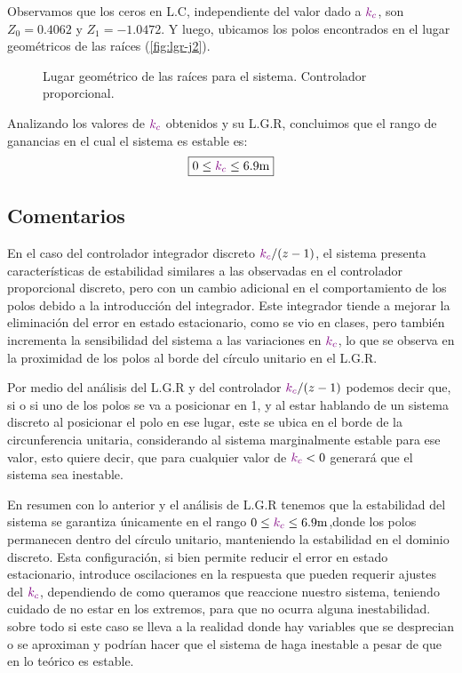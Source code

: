Observamos que los ceros en L.C, independiente del valor dado a \(\mathbin{\color{violet}k_c}\),
son $Z_{0} = 0.4062 $ y $Z_{1} = -1.0472$. Y luego, ubicamos los polos encontrados
en el lugar geométricos de las raíces (\autoref{fig:lgr-j2}).

\begin{figure}[ht]
  \centering
  
  \caption{Lugar geométrico de las raíces para el sistema. Controlador proporcional.}
  \label{fig:lgr-j2}
\end{figure}


Analizando los valores de \(\mathbin{\color{violet}k_c}\) obtenidos y su L.G.R, concluimos que el
rango de ganancias en el cual el sistema es estable es:
\begin{equation}
  \boxed{ 0 \leq \mora{k_{c}} \leq 6.9\unit{m} }
\end{equation}

\subsection{Comentarios}


En el caso del controlador integrador discreto \(\mathbin{\color{violet}k_c}/(z-1)\), el sistema presenta características de estabilidad similares a las observadas en el controlador proporcional discreto, pero con un cambio adicional en el comportamiento de los polos debido a la introducción del integrador. Este integrador tiende a mejorar la eliminación del error en estado estacionario, como se vio en clases, pero también incrementa la sensibilidad del sistema a las variaciones en \(\mathbin{\color{violet}k_c}\), lo que se observa en la proximidad de los polos al borde del círculo unitario en el L.G.R.

Por medio del análisis del L.G.R y del controlador \(\mathbin{\color{violet}k_c}/(z-1)\) podemos decir que, si o si uno de los polos se va a posicionar en 1, y al estar hablando de un sistema discreto al posicionar el polo en ese lugar, este se ubica en el borde de la circunferencia unitaria, considerando al sistema marginalmente estable para ese valor, esto quiere decir, que para cualquier valor de \(\mathbin{\color{violet}k_c}< 0\) generará que el sistema sea inestable. 


En resumen con lo anterior y el análisis de L.G.R tenemos que la estabilidad del sistema se garantiza únicamente en el rango \(0 \leq \mora{k_{c}} \leq 6.9\unit{m} \),donde los polos permanecen dentro del círculo unitario, manteniendo la estabilidad en el dominio discreto. Esta configuración, si bien permite reducir el error en estado estacionario, introduce oscilaciones en la respuesta que pueden requerir ajustes del \(\mathbin{\color{violet}k_{c}} \), dependiendo de como queramos que reaccione nuestro sistema, teniendo cuidado de no estar en los extremos, para que no ocurra alguna inestabilidad. sobre todo si este caso se lleva a la realidad donde hay variables que se desprecian o se aproximan y podrían hacer que el sistema de haga inestable a pesar de que en lo teórico es estable. 
